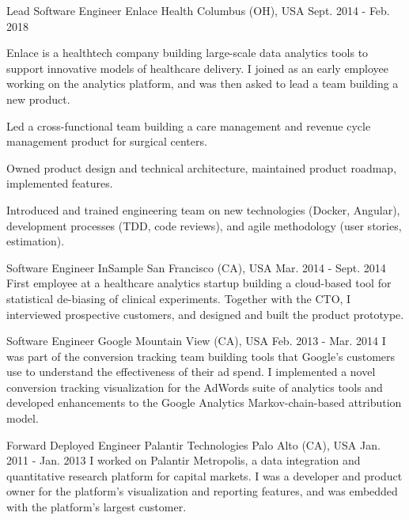 \begin{cventries}
  \cventry
    {Lead Software Engineer} %
    {Enlace Health} %
    {Columbus (OH), USA} %
    {Sept. 2014 - Feb. 2018} %
    {
      Enlace is a healthtech company building large-scale data analytics tools to support innovative models of healthcare delivery. I joined as an early employee working on the  analytics platform, and was then asked to lead a team building a new product.
      \vspace{5.0mm}
      \begin{cvitems} %
        \item {Led a cross-functional team building a care management and revenue cycle management product for surgical centers.}
        \item {Owned product design and technical architecture, maintained product roadmap, implemented features.}
        \item {Introduced and trained engineering team on new technologies (Docker, Angular), development processes (TDD, code reviews), and agile methodology (user stories, estimation).}
      \end{cvitems}
    }

  \cventry
    {Software Engineer} %
    {InSample} %
    {San Francisco (CA), USA} %
    {Mar. 2014 - Sept. 2014} %
    {
      First employee at a healthcare analytics startup building a cloud-based tool for statistical de-biasing of clinical experiments. Together with the CTO, I interviewed prospective customers, and designed and built the product prototype.
      \vspace{3.0mm}
    }

  \cventry
    {Software Engineer} %
    {Google} %
    {Mountain View (CA), USA} %
    {Feb. 2013 - Mar. 2014} %
    {
      I was part of the conversion tracking team building tools that Google's customers use to understand the effectiveness of their ad spend. I implemented a novel conversion tracking visualization for the AdWords suite of analytics tools and developed enhancements to the Google Analytics Markov-chain-based attribution model.
      \vspace{3.0mm}
    }

  \cventry
    {Forward Deployed Engineer} %
    {Palantir Technologies} %
    {Palo Alto (CA), USA} %
    {Jan. 2011 - Jan. 2013} %
    {
      I worked on Palantir Metropolis, a data integration and quantitative research platform for capital markets. I was a developer and product owner for the platform's visualization and reporting features, and was embedded with the platform's largest customer.
    }

\end{cventries}
